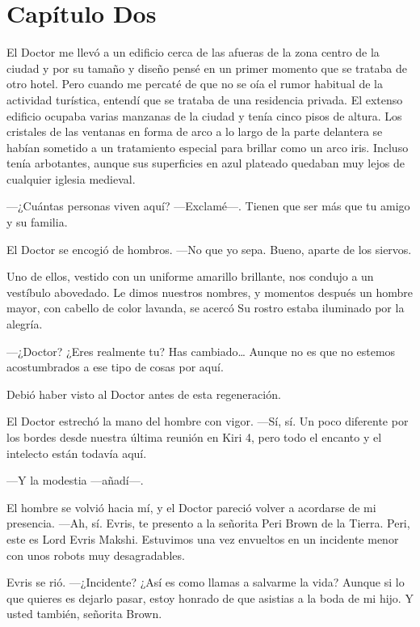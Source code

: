 \chapter*{Capítulo Dos}

El Doctor me llevó a un edificio cerca de las afueras de la zona centro
de la ciudad y por su tamaño y diseño pensé en un primer momento que se
trataba de otro hotel. Pero cuando me percaté de que no se oía el rumor
habitual de la actividad turística, entendí que se trataba de una
residencia privada. El extenso edificio ocupaba varias manzanas de la
ciudad y tenía cinco pisos de altura. Los cristales de las ventanas en
forma de arco a lo largo de la parte delantera se habían sometido a un
tratamiento especial para brillar como un arco iris. Incluso tenía
arbotantes, aunque sus superficies en azul plateado quedaban muy lejos
de cualquier iglesia medieval.

---¿Cuántas personas viven aquí? ---Exclamé---. Tienen que ser más que
tu amigo y su familia.

El Doctor se encogió de hombros. ---No que yo sepa. Bueno, aparte de los
siervos.

Uno de ellos, vestido con un uniforme amarillo brillante, nos condujo a
un vestíbulo abovedado. Le dimos nuestros nombres, y momentos después un
hombre mayor, con cabello de color lavanda, se acercó Su rostro estaba
iluminado por la alegría.

---¿Doctor? ¿Eres realmente tu? Has cambiado\ldots{} Aunque no es que no
estemos acostumbrados a ese tipo de cosas por aquí.

Debió haber visto al Doctor antes de esta regeneración.

El Doctor estrechó la mano del hombre con vigor. ---Sí, sí. Un poco
diferente por los bordes desde nuestra última reunión en Kiri 4, pero
todo el encanto y el intelecto están todavía aquí.

---Y la modestia ---añadí---.

El hombre se volvió hacia mí, y el Doctor pareció volver a acordarse de
mi presencia. ---Ah, sí. Evris, te presento a la señorita Peri Brown de
la Tierra. Peri, este es Lord Evris Makshi. Estuvimos una vez envueltos
en un incidente menor con unos robots muy desagradables.

Evris se rió. ---¿Incidente? ¿Así es como llamas a salvarme la vida?
Aunque si lo que quieres es dejarlo pasar, estoy honrado de que asistias
a la boda de mi hijo. Y usted también, señorita Brown.

